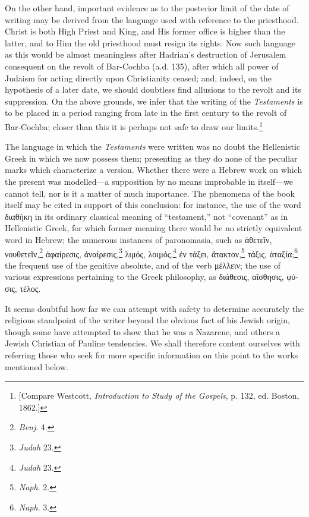 On the other hand, important evidence as to the posterior limit of the date of writing may be derived from the language used with reference to the priesthood. Christ is both High Priest and King, and His former office is higher than the latter, and to Him the old priesthood must resign its rights. Now such language as this would be almost meaningless after Hadrian’s destruction of Jerusalem consequent on the revolt of Bar-Cochba (a.d. 135), after which all power of Judaism for acting directly upon Christianity ceased; and, indeed, on the hypothesis of a later date, we should doubtless find allusions to the revolt and its suppression. On the above grounds, we infer that the writing of the \emph{Testaments} is to be placed in a period ranging from late in the first century to the revolt of Bar-Cochba; closer than this it is perhaps not safe to draw our limits.\footnote{[Compare Westcott, \emph{Introduction to Study of the Gospels}, p. 132, ed. Boston, 1862.]}

The language in which the \emph{Testaments} were written was no doubt the Hellenistic Greek in which we now possess them; presenting as they do none of the peculiar marks which characterize a version. Whether there were a Hebrew work on which the present was modelled—a supposition by no means improbable in itself—we cannot tell, nor is it a matter of much importance. The phenomena of the book itself may be cited in support of this conclusion: for instance, the use of the word \textgreek{διαθήκη} in its ordinary classical meaning of “testament,” not “covenant” as in Hellenistic Greek, for which former meaning there would be no strictly equivalent word in Hebrew; the numerous instances of paronomasia, such as \textgreek{ἀθετεῖν, νουθετεῖν},\footnote{\emph{Benj}. 4.} \textgreek{ἀφαίρεσις, ἀναίρεσις},\footnote{\emph{Judah} 23.} \textgreek{λιμός, λοιμός},\footnote{\emph{Judah} 23.} \textgreek{ἐν τάξει, ἄτακτον},\footnote{\emph{Naph}. 2.} \textgreek{τάξις, ἀταξία};\footnote{\emph{Naph}. 3.} the frequent use of the genitive absolute, and of the verb \textgreek{μέλλειν}; the use of various expressions pertaining to the Greek philosophy, as \textgreek{διάθεσις, αἴσθησις, φύσις, τέλος}.

It seems doubtful how far we can attempt with safety to determine accurately the religious standpoint of the writer beyond the obvious fact of his Jewish origin, though some have attempted to show that he was a Nazarene, and others a Jewish Christian of Pauline tendencies. We shall therefore content ourselves with referring those who seek for more specific information on this point to the works mentioned below.

